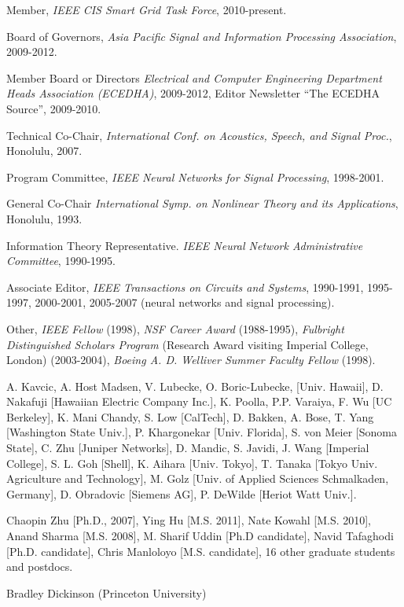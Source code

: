 \begin{Synergistic Activities}
\item Member, {\it IEEE CIS Smart Grid Task Force}, 2010-present.
\item Board of Governors, {\it Asia Pacific Signal and Information Processing Association}, 2009-2012.
\item Member Board or Directors {\it Electrical and Computer Engineering Department Heads  Association (ECEDHA)}, 2009-2012, Editor Newsletter ``The ECEDHA Source'', 2009-2010.
\item Technical Co-Chair, {\it International Conf. on Acoustics, Speech, and Signal Proc.}, Honolulu, 2007.
\item Program Committee, {\it IEEE Neural Networks for Signal Processing}, 1998-2001.
\item General Co-Chair {\it International Symp. on Nonlinear Theory and its Applications}, Honolulu, 1993.
\item Information Theory Representative. {\it IEEE Neural Network Administrative Committee}, 1990-1995.
\item Associate Editor, {\it IEEE Transactions on Circuits and Systems}, 1990-1991, 1995-1997, 2000-2001, 2005-2007 (neural networks and signal processing).
\item Other, {\it IEEE Fellow} (1998), {\it NSF Career Award} (1988-1995), {\it Fulbright
Distinguished Scholars Program} (Research Award visiting Imperial College, London) (2003-2004), {\it Boeing A. D. Welliver Summer Faculty Fellow} (1998).
\end{Synergistic Activities}


\begin{Collaborators and Co-Editors}
\item A. Kavcic, A. Host Madsen, V. Lubecke, O. Boric-Lubecke, [Univ. Hawaii], D. Nakafuji [Hawaiian Electric Company Inc.], K. Poolla, P.P. Varaiya, F. Wu [UC Berkeley], K. Mani Chandy, 
S. Low [CalTech], D. Bakken, A. Bose, T. Yang [Washington State Univ.], P. Khargonekar 
[Univ. Florida], S. von Meier [Sonoma State], C. Zhu [Juniper Networks], D. Mandic, S. Javidi, J. Wang [Imperial College], S. L. Goh [Shell], K. Aihara [Univ. Tokyo], T. Tanaka [Tokyo Univ. Agriculture and Technology], M. Golz [Univ. of Applied Sciences Schmalkaden, Germany], D. Obradovic [Siemens AG], P. DeWilde [Heriot Watt Univ.].
\end{Collaborators and Co-Editors}


\begin{Graduate Advisors and Postdoctoral Sponsors}
\item Chaopin Zhu [Ph.D., 2007], Ying Hu [M.S. 2011], Nate Kowahl [M.S. 2010], Anand Sharma [M.S. 2008],  M. Sharif Uddin [Ph.D candidate], Navid Tafaghodi [Ph.D. candidate], 
Chris  Manloloyo [M.S. candidate], 16 other graduate students and postdocs.
\end{Graduate Advisors and Postdoctoral Sponsors}

\begin{Thesis Advisor and Postgraduate-Scholar Sponsor}
\item Bradley Dickinson (Princeton University)
\end{Thesis Advisor and Postgraduate-Scholar Sponsor}












